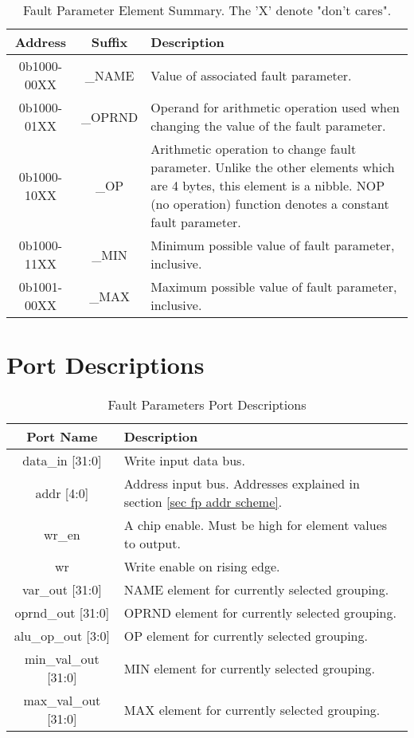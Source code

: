 \documentclass[]{report}
\begin{document}
\begin{table}[h]
	\centering
	\caption{Fault Parameter Element Summary. The 'X' denote "don't cares".}
	\begin{tabular}{|c|c|p{9cm}|}
		\hline 
		Address & Suffix & Description \\ 
		\hline
		0b1000-00XX & \_NAME & Value of associated fault parameter.\\
		\hline
		0b1000-01XX & \_OPRND & Operand for arithmetic operation used when changing the value of the fault parameter. \\ 
		\hline 
		0b1000-10XX & \_OP & Arithmetic operation to change fault parameter. Unlike the other elements which are 4 bytes, this element is a nibble. NOP (no operation) function denotes a constant fault parameter. \\ 
		\hline 
		0b1000-11XX & \_MIN & Minimum possible value of fault parameter, inclusive. \\ 
		\hline 
		0b1001-00XX & \_MAX & Maximum possible value of fault parameter, inclusive. \\ 
		\hline 
	\end{tabular} 
	\label{table:element summary}
\end{table}
\clearpage
\section{Port Descriptions}
\label{s fp port summ}

\begin{table}[th]
	\centering
	\caption{Fault Parameters Port Descriptions}
	\label{table:fp port desc}
	\begin{tabular}{|c|p{}|}
		\hline 
		Port Name & Description \\ 
		\hline 
		data\_in [31:0] & Write input data bus.\\  
		\hline
		addr [4:0]& Address input bus. Addresses explained in section \ref{sec fp addr scheme}.\\
		\hline
		wr\_en & A chip enable. Must be high for element values to output.\\
		\hline
		wr & Write enable on rising edge.\\
		\hline
		var\_out [31:0] & NAME element for currently selected grouping.\\
		\hline
		oprnd\_out [31:0] & OPRND element for currently selected grouping.\\
		\hline
		alu\_op\_out [3:0] & OP element for currently selected grouping.\\
		\hline
		min\_val\_out [31:0] & MIN element for currently selected grouping.\\
		\hline
		max\_val\_out [31:0] & MAX element for currently selected grouping.\\
		\hline
	\end{tabular}
\end{table}
\end{document}
